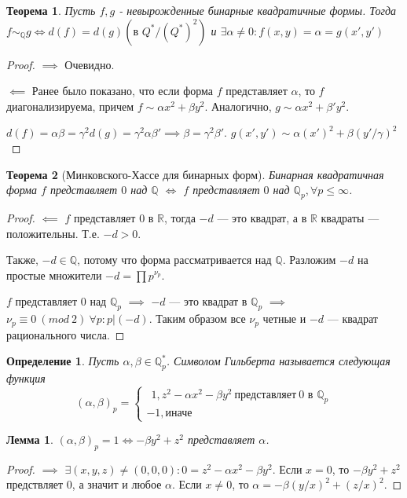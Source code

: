 \documentclass[11pt]{article}
\newtheorem{theorem}{Теорема}
\newtheorem{lemma}{Лемма}
\newtheorem{definition}{Определение}
\newcommand{\R}{\mathbb{R}}
\newcommand{\Q}{\mathbb{Q}}
\begin{document}
\begin{theorem}
    Пусть $f, g$ - невырожденные бинарные квадратичные формы.
    Тогда $f \sim_{\Q} g \iff d(f) = d(g) (\text{в } Q^* / (Q^*)^2)$ и $\exists \alpha \neq 0: f(x, y) = \alpha = g(x', y')$
\end{theorem}
\begin{proof}
    $\implies$ Очевидно.
    
    $\impliedby$ Ранее было показано, что если форма $f$ представляет $\alpha$, то $f$ диагонализируема, причем $f \sim \alpha x^2 + \beta y^2$.
    Аналогично, $g \sim \alpha x^2 + \beta 'y^2$.

    $d(f) = \alpha \beta = \gamma^2 d(g) = \gamma^2 \alpha \beta' \implies \beta = \gamma^2 \beta'$.
    $g(x', y') \sim \alpha (x')^2 + \beta (y'/\gamma)^2$
\end{proof}

\begin{theorem}[Минковского-Хассе для бинарных форм]
    Бинарная квадратичная форма $f$ представляет $0$ над $\Q$ $\iff$ $f$ представляет $0$ над $\Q_p, \forall p \leq \infty$.
\end{theorem}
\begin{proof}
    $\impliedby$
    $f$ представляет $0$ в $\R$, тогда $-d$ --- это квадрат, а в $\R$ квадраты --- положительны.
    Т.е. $-d > 0$.

    Также, $-d \in \Q$, потому что форма рассматривается над $\Q$.
    Разложим $-d$ на простые множители $-d = \prod p^{\nu_p}$.

    $f$ представляет $0$ над $\Q_p$ $\implies$ $-d$ --- это квадрат в $\Q_p$ $\implies$ $\nu_p \equiv 0\ (mod\ 2)\ \forall p: p | (-d)$.
    Таким образом все $\nu_p$ четные и $-d$ --- квадрат рационального числа.
\end{proof}

\begin{definition}
    Пусть $\alpha, \beta \in \Q_p^*$.
    Символом Гильберта называется следующая функция
    \begin{equation*}
    (\alpha, \beta)_p = \begin{cases}
        \ \ 1, z^2 - \alpha x^2 - \beta y^2\ \text{представляет}\ 0 \text{ в } \Q_p\\
        -1, \text{иначе}
    \end{cases}
    \end{equation*}
\end{definition}

\begin{lemma}
    $(\alpha, \beta)_p = 1 \iff -\beta y^2 + z^2$ представляет $\alpha$.
\end{lemma}
\begin{proof}
    $\implies$ $\exists (x, y, z) \neq (0, 0, 0): 0 = z^2 - \alpha x^2 - \beta y^2$.
    Если $x = 0$, то $-\beta y^2 + z^2$ предствляет $0$, а значит и любое $\alpha$.
    Если $x \neq 0$, то $\alpha =-\beta (y/x)^2 + (z/x)^2$.
\end{proof}
\end{document}
